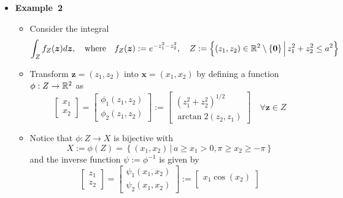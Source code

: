 \documentclass[12pt,a4paper]{article}
\begin{document}
\begin{itemize}
\item \textbf{Example~2}

  \begin{itemize}
  \item Consider the integral
    \begin{equation}\nonumber%
      \int_{Z}f_{Z}(\bm{z})d\bm{z},
      \quad\text{where}\quad
      f_{Z}(\bm{z}):=e^{-z_{1}^{2}-z_{2}^{2}},
      \quad
      Z:= \left\{ (z_{1},z_{2})\in \R^{2}\setminus\{\bm{0}\} \,\Big|\, z_{1}^{2} + z_{2}^{2} \leq a^{2} \right\}
    \end{equation}
  \item Transform $\bm{z}=(z_{1},z_{2})$ into $\bm{x}=(x_{1},x_{2})$ by defining a function $\phi:Z \to \mathbb{R}^{2}$ as
    \begin{equation}\nonumber%
      \begin{bmatrix}
        x_{1} \\
        x_{2}
      \end{bmatrix}
      =
      \begin{bmatrix}
        \phi_{1}(z_{1},z_{2}) \\
        \phi_{2}(z_{1},z_{2})
      \end{bmatrix}
      :=
      \begin{bmatrix}
        (z_{1}^{2} + z_{2}^{2})^{1/2} \\
        \arctan2(z_{2},z_{1})
      \end{bmatrix}
      \quad \forall \bm{z}\in Z
    \end{equation}
  \item Notice that $\phi:Z \to X$ is bijective with
    \begin{equation}\nonumber%
      X:= \phi(Z) = \left\{ (x_{1},x_{2}) \,|\, a \geq x_{1}> 0, \pi\geq x_{2} \geq -\pi \right\}
    \end{equation}
    and the inverse function $\psi:=\phi^{-1}$ is given by
    \begin{equation}\nonumber%
      \begin{bmatrix}
        z_{1} \\
        z_{2}
      \end{bmatrix}
      =
      \begin{bmatrix}
        \psi_{1}(x_{1},x_{2}) \\
        \psi_{2}(x_{1},x_{2})
      \end{bmatrix}
      :=
      \begin{bmatrix}
        x_{1}\cos(x_{2}) \\

\end{bmatrix}
\end{equation}
\end{itemize}
\end{itemize}
\end{document}
